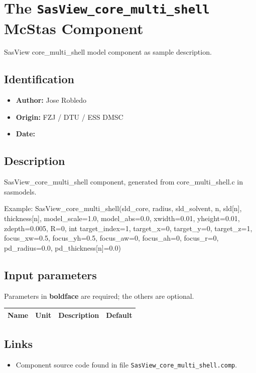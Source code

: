 \section{The \texttt{SasView\_core\_multi\_shell} McStas Component}
SasView core\_multi\_shell model component as sample description.

\subsection*{Identification}
\begin{itemize}
  \item \textbf{Author:} Jose Robledo
  \item \textbf{Origin:} FZJ / DTU / ESS DMSC
  \item \textbf{Date:} 
\end{itemize}

\subsection*{Description}
SasView\_core\_multi\_shell component, generated from core\_multi\_shell.c in sasmodels.

Example: SasView\_core\_multi\_shell(sld\_core, radius, sld\_solvent, n, sld[n], thickness[n], model\_scale=1.0, model\_abs=0.0, xwidth=0.01, yheight=0.01, zdepth=0.005, R=0, int target\_index=1, target\_x=0, target\_y=0, target\_z=1, focus\_xw=0.5, focus\_yh=0.5, focus\_aw=0, focus\_ah=0, focus\_r=0, pd\_radius=0.0, pd\_thickness[n]=0.0)

\subsection*{Input parameters}
Parameters in \textbf{boldface} are required; the others are optional.

\begin{longtable}{p{}p{}p{}p{}}
\toprule
\textbf{Name} & \textbf{Unit} & \textbf{Description} & \textbf{Default} \\
\midrule
\endhead
\bottomrule
\end{longtable}

\subsection*{Links}
\begin{itemize}
  \item Component source code found in file \texttt{SasView\_core\_multi\_shell.comp}.
\end{itemize}

